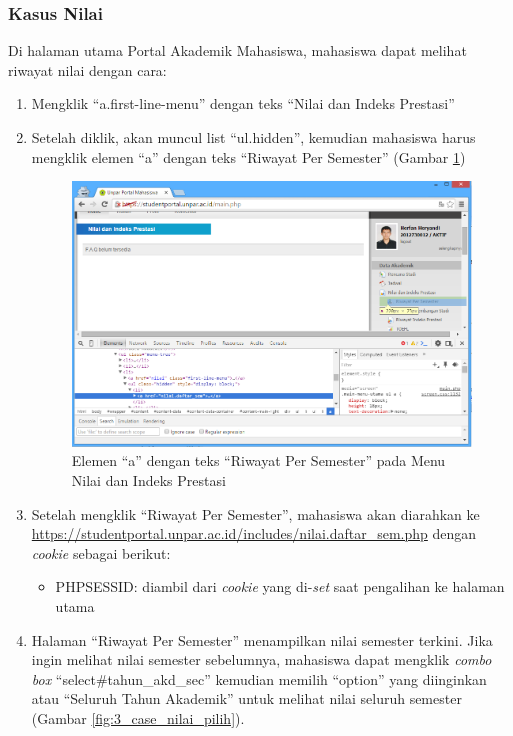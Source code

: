 \subsubsection{Kasus Nilai}
Di halaman utama Portal Akademik Mahasiswa, mahasiswa dapat melihat riwayat nilai dengan cara:
\begin{enumerate}
	\item Mengklik ``a.first-line-menu'' dengan teks ``Nilai dan Indeks Prestasi'' 
	\item Setelah diklik, akan muncul list ``ul.hidden'', kemudian mahasiswa harus mengklik elemen ``a'' dengan teks ``Riwayat Per Semester'' (Gambar \ref{fig:3_case_nilai_menu})
	\begin{figure}[H]
			\centering
			\includegraphics[scale=0.4]{Gambar/case-nilai-menu}
			\caption{Elemen ``a'' dengan teks ``Riwayat Per Semester'' pada Menu Nilai dan Indeks Prestasi} 
			\label{fig:3_case_nilai_menu}
		\end{figure}
		\item Setelah mengklik ``Riwayat Per Semester'', mahasiswa akan diarahkan ke \url{https://studentportal.unpar.ac.id/includes/nilai.daftar_sem.php} dengan \textit{cookie} sebagai berikut:
\begin{itemize}
	\item PHPSESSID: diambil dari \textit{cookie} yang di-\textit{set} saat pengalihan ke halaman utama
\end{itemize}
		\item Halaman ``Riwayat Per Semester'' menampilkan nilai semester terkini. Jika ingin melihat nilai semester sebelumnya, mahasiswa dapat mengklik \textit{combo box} ``select\#tahun\_akd\_sec'' kemudian memilih ``option'' yang diinginkan atau ``Seluruh Tahun Akademik'' untuk melihat nilai seluruh semester (Gambar \ref{fig:3_case_nilai_pilih}).
		

\end{enumerate}
